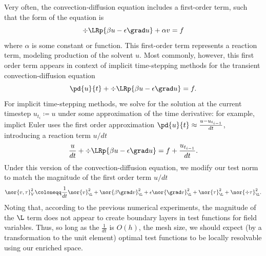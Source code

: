 Very often, the convection-diffusion equation includes a first-order term, such that the form of the equation is
\[
\div\LRp{\beta u - \epsilon \grad u} + \alpha v = f
\]
where $\alpha$ is some constant or function.
This first-order term represents a reaction term, modeling production of the solvent $u$.  Most commonly, however, this first order term appears in context of implicit time-stepping methods for the transient convection-diffusion equation
\[
\pd{u}{t}+\div\LRp{\beta u - \epsilon \grad u} = f.
\]
For implicit time-stepping methods, we solve for the solution at the current timestep $u_{t_i} \coloneqq u$ under some approximation of the time derivative: for example, implict Euler uses the first order approximation $\pd{u}{t} \approx \frac{u-u_{t_{i-1}}}{dt}$, introducing a reaction term $u/dt$
\[
\frac{u}{dt}+\div\LRp{\beta u - \epsilon \grad u} = f + \frac{u_{t_{i-1}}}{dt}.
\]
Under this version of the convection-diffusion equation, we modify our test norm to match the magnitude of the first order term $u/dt$
\[
\nor{v,\tau}_V^2 \coloneqq \frac{1}{dt}\nor{v}_{\L}^2 + \nor{\beta\grad v}_{\L}^2 + \epsilon \nor{\grad v}_{\L}^2 + \nor{\tau}_{\L}^2 + \nor{\div \tau}_{\L}^2.
\]
Noting that, according to the previous numerical experiments, the magnitude of the $\L$ term does not appear to create boundary layers in test functions for field variables.  Thus, so long as the $\frac{1}{dt}$ is $O(h)$, the mesh size, we should expect (by a transformation to the unit element) optimal test functions to be locally resolvable using our enriched space.

